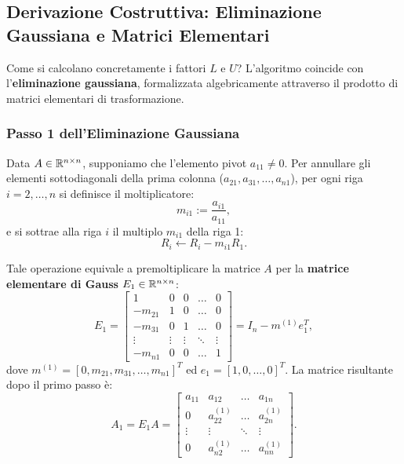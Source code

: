 \subsection{Derivazione Costruttiva: Eliminazione Gaussiana e Matrici Elementari}
Come si calcolano concretamente i fattori $L$ e $U$? L'algoritmo coincide con l'\textbf{eliminazione gaussiana}, formalizzata algebricamente attraverso il prodotto di matrici elementari di trasformazione.

\subsubsection{Passo 1 dell'Eliminazione Gaussiana}
Data $A \in \mathbb{R}^{n \times n}$, supponiamo che l'elemento pivot $a_{11} \neq 0$. Per annullare gli elementi sottodiagonali della prima colonna ($a_{21}, a_{31}, \dots, a_{n1}$), per ogni riga $i = 2, \dots, n$ si definisce il moltiplicatore:
\begin{equation}
    m_{i1} := \frac{a_{i1}}{a_{11}},
\end{equation}
e si sottrae alla riga $i$ il multiplo $m_{i1}$ della riga 1:
\begin{equation}
    R_i \leftarrow R_i - m_{i1} R_1.
\end{equation}

Tale operazione equivale a premoltiplicare la matrice $A$ per la \textbf{matrice elementare di Gauss} $E_1 \in \mathbb{R}^{n \times n}$:
\begin{equation}
    E_1 = \begin{bmatrix}
        1 & 0 & 0 & \dots & 0 \\
        -m_{21} & 1 & 0 & \dots & 0 \\
        -m_{31} & 0 & 1 & \dots & 0 \\
        \vdots & \vdots & \vdots & \ddots & \vdots \\
        -m_{n1} & 0 & 0 & \dots & 1
    \end{bmatrix} = I_n - m^{(1)} e_1^T,
    \label{eq:matrice-elementare-e1}
\end{equation}
dove $m^{(1)} = [0, m_{21}, m_{31}, \dots, m_{n1}]^T$ ed $e_1 = [1, 0, \dots, 0]^T$. La matrice risultante dopo il primo passo \`e:
\begin{equation}
    A_1 = E_1 A = \begin{bmatrix}
        a_{11} & a_{12} & \dots & a_{1n} \\
        0 & a_{22}^{(1)} & \dots & a_{2n}^{(1)} \\
        \vdots & \vdots & \ddots & \vdots \\
        0 & a_{n2}^{(1)} & \dots & a_{nn}^{(1)}
    \end{bmatrix}.
\end{equation}

